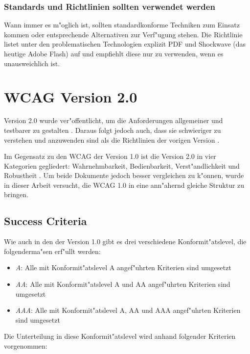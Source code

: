 \documentclass[a4paper,bibtotoc,oneside]{scrbook}
\begin{document}
\subsubsection{Standards und Richtlinien sollten verwendet werden}
Wann immer es m"oglich ist, sollten standardkonforme Techniken zum Einsatz kommen oder entsprechende Alternativen zur Verf"ugung stehen. Die Richtlinie listet unter den problematischen Technologien explizit PDF und Shockwave (das heutige Adobe Flash) auf und empfiehlt diese nur zu verwenden, wenn es unausweichlich ist. \cite[Abschnitt 6.11]{wcag1}

\section{WCAG Version 2.0}
Version 2.0 wurde ver"offentlicht, um die Anforderungen allgemeiner und testbarer zu gestalten \cite[S. 20]{tool_acc}. Daraus folgt jedoch auch, dass sie schwieriger zu verstehen und anzuwenden sind als die Richtlinien der vorigen Version \cite[S. 24]{mod_software}.

Im Gegensatz zu den WCAG der Version 1.0 ist die Version 2.0 in vier Kategorien gegliedert: Wahrnehmbarkeit, Bedienbarkeit, Verst"andlichkeit und Robustheit \cite[S. 23-24]{mod_software}. Um beide Dokumente jedoch besser vergleichen zu k"onnen, wurde in dieser Arbeit versucht, die WCAG 1.0 in eine ann"ahernd gleiche Struktur zu bringen. 


\subsection{Success Criteria}
Wie auch in den der Version 1.0 gibt es drei verschiedene Konformit"atslevel, die folgenderma"sen erf"ullt werden: \cite[Abschnitt Understanding Requirement 1]{understand_conform}

\begin{itemize}
\item \emph{A}: Alle mit Konformit"atslevel A angef"uhrten Kriterien sind umgesetzt
\item \emph{AA}: Alle mit Konformit"atslevel A und AA angef"uhrten Kriterien sind umgesetzt
\item \emph{AAA}: Alle mit Konformit"atslevel A, AA und AAA angef"uhrten Kriterien sind umgesetzt
\end{itemize}

Die Unterteilung in diese Konformit"atslevel wird anhand folgender Kriterien vorgenommen: \cite[Abschnitt Understanding Levels of Conformance]{understand_conform}
\end{document}
